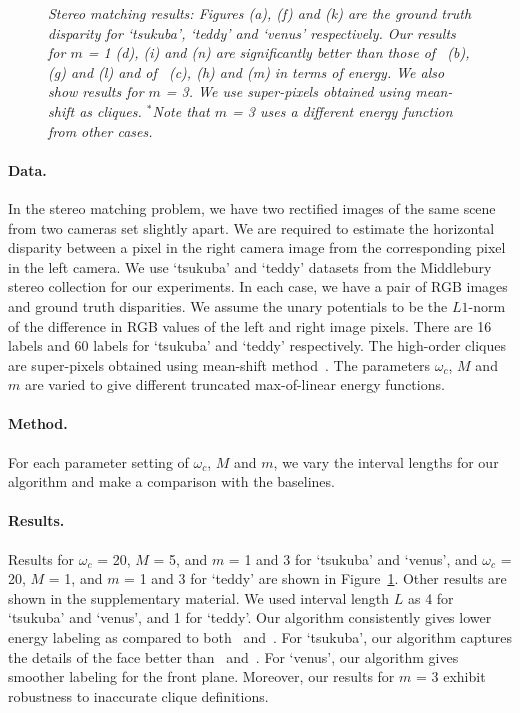 \documentclass[runningheads]{llncs}
\newcommand{\myparagraph}[1]{\vspace{-2mm}\paragraph{#1}}
\newcommand{\mycaption}[1]{\vspace{-1mm}\caption{#1}\vspace{-3mm}}
\begin{document}
\begin{figure}[t]
\begin{tabular}{ccccc}
\end{tabular}
\vspace{2mm}
\mycaption{\footnotesize \em Stereo matching results: Figures (a), (f) and (k) are the ground truth disparity for `tsukuba', `teddy' and `venus' respectively. Our results for $m$ = 1 (d), (i) and (n) are significantly better than those of~\cite{ladickyeccv10} (b), (g) and (l) and of~\cite{dokaniaiccv15} (c), (h) and (m)  in terms of energy. We also show results for $m$ = 3. We use super-pixels obtained using mean-shift as cliques. $^*$Note that $m$ = 3 uses a different energy function from other cases.}
\label{fig:stereo_matching}
\end{figure}


\myparagraph{\bf Data.} In the stereo matching problem, we have two rectified images of the same scene from two cameras set slightly apart. We are required to estimate the horizontal disparity between a pixel in the right camera image from the corresponding pixel in the left camera. We use `tsukuba' and `teddy' datasets from the Middlebury stereo collection for our experiments. In each case, we have a pair of RGB images and ground truth disparities. We assume the unary potentials to be the $L1$-norm of the difference in RGB values of the left and right image pixels. There are 16 labels and 60 labels for `tsukuba' and `teddy' respectively. The high-order cliques are super-pixels obtained using mean-shift method~\cite{comaniciu2002mean}. The parameters $\omega_c$, $M$ and $m$ are varied to give different truncated max-of-linear energy functions.


\myparagraph{\bf Method.} For each parameter setting of $\omega_c$, $M$ and $m$, we vary the interval lengths for our algorithm and make a comparison with the baselines.

\myparagraph{\bf Results.} Results for $\omega_c$ = 20, $M$ = 5, and $m$ = 1 and 3 for `tsukuba' and `venus', and $\omega_c$ = 20, $M$ = 1, and $m$ = 1 and 3 for `teddy' are shown in Figure~\ref{fig:stereo_matching}. Other results are shown in the supplementary material. We used interval length $L$ as 4 for `tsukuba' and `venus', and 1 for `teddy'. Our algorithm consistently gives lower energy labeling as compared to both~\cite{dokaniaiccv15} and~\cite{ladickyeccv10}. For `tsukuba', our algorithm captures the details of the face better than~\cite{dokaniaiccv15} and~\cite{ladickyeccv10}. For `venus', our algorithm gives smoother labeling for the front plane. Moreover, our results for $m$ = 3 exhibit robustness to inaccurate clique definitions. 
\end{document}

